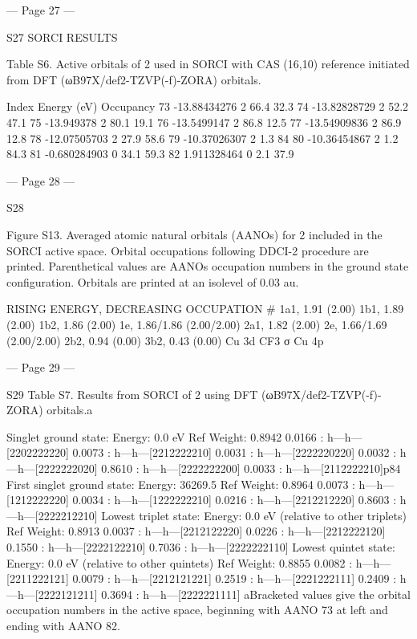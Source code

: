 --- Page 27 ---
 
S27 
SORCI RESULTS 
 
Table S6. Active orbitals of 2 used in SORCI with CAS (16,10) reference initiated from DFT 
(ωB97X/def2-TZVP(-f)-ZORA) orbitals. 
 
Index 
Energy (eV) 
Occupancy 
73 
-13.88434276 
2 
66.4 
32.3 
74 
-13.82828729 
2 
52.2 
47.1 
75 
-13.949378 
2 
80.1 
19.1 
76 
-13.5499147 
2 
86.8 
12.5 
77 
-13.54909836 
2 
86.9 
12.8 
78 
-12.07505703 
2 
27.9 
58.6 
79 
-10.37026307 
2 
1.3 
84 
80 
-10.36454867 
2 
1.2 
84.3 
81 
-0.680284903 
0 
34.1 
59.3 
82 
1.911328464 
0 
2.1 
37.9 
 


--- Page 28 ---
 
S28 
 
 
Figure S13. Averaged atomic natural orbitals (AANOs) for 2 included in the SORCI active 
space. Orbital occupations following DDCI-2 procedure are printed. Parenthetical values are 
AANOs occupation numbers in the ground state configuration. Orbitals are printed at an isolevel 
of 0.03 au. 
 
 
 
 
 
 
 
 
RISING ENERGY, DECREASING OCCUPATION # 
1a1, 1.91 (2.00)  
1b1, 1.89 (2.00)  
1b2, 1.86 (2.00)  
1e, 1.86/1.86 (2.00/2.00)  
2a1, 1.82 (2.00)  
2e, 1.66/1.69 (2.00/2.00)  
2b2, 0.94 (0.00)  
3b2, 0.43 (0.00)  
Cu 3d 
CF3 σ 
Cu 4p 


--- Page 29 ---
 
S29 
Table S7. Results from SORCI of 2 using DFT (ωB97X/def2-TZVP(-f)-ZORA) orbitals.a 
 
Singlet ground state:  
Energy: 0.0 eV 
Ref Weight: 
0.8942 
      0.0166  : h---h---[2202222220] 
      0.0073  : h---h---[2212222210] 
      0.0031  : h---h---[2222220220] 
      0.0032  : h---h---[2222222020] 
      0.8610  : h---h---[2222222200] 
      0.0033  : h---h---[2112222210]p84 
First singlet ground state: Energy: 36269.5 
Ref Weight: 
0.8964 
      0.0073  : h---h---[1212222220] 
      0.0034  : h---h---[1222222210] 
      0.0216  : h---h---[2212212220] 
      0.8603  : h---h---[2222212210] 
Lowest triplet state:  
Energy: 0.0 eV (relative to other triplets) Ref Weight: 0.8913 
      0.0037  : h---h---[2212122220] 
      0.0226  : h---h---[2212222120] 
      0.1550  : h---h---[2222122210] 
      0.7036  : h---h---[2222222110] 
Lowest quintet state:  
Energy: 0.0 eV (relative to other quintets) Ref Weight: 0.8855 
      0.0082  : h---h---[2211222121] 
      0.0079  : h---h---[2212121221] 
      0.2519  : h---h---[2221222111] 
      0.2409  : h---h---[2222121211] 
      0.3694  : h---h---[2222221111] 
aBracketed values give the orbital occupation numbers in the active space, beginning with 
AANO 73 at left and ending with AANO 82. 
 
